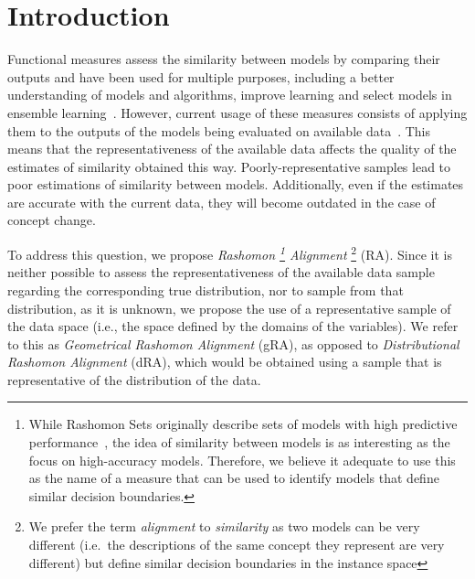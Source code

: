 \documentclass[runningheads]{llncs}
\begin{document}


\section{Introduction}

Functional measures assess the similarity between models by comparing their outputs and have been used for multiple purposes, including a better understanding of models and algorithms, improve learning and select models in ensemble learning~\cite{Klabunde2025}. However, current usage of these measures consists of applying them to the outputs of the models being evaluated on available data~\cite{Lee2011,Klabunde2025}. This means that the representativeness of the available data affects the quality of the estimates of similarity obtained this way. Poorly-representative samples lead to poor estimations of similarity between models. Additionally, even if the estimates are accurate with the current data, they will become outdated in the case of concept change.


To address this question, we propose \emph{Rashomon%
\footnote{While Rashomon Sets originally describe sets of models with high predictive performance~\cite{Breiman2001,Fisher2019}, the idea of similarity between models is as interesting as the focus on high-accuracy models. Therefore, we believe it adequate to use this as the name of a measure that can be used to identify models that define similar decision boundaries.} Alignment}%
\footnote{We prefer the term \emph{alignment} to \emph{similarity} as two models can be very different (i.e.\ the descriptions of the same concept they represent are very different) but define similar decision boundaries in the instance space}
(RA).
Since it is neither possible to assess the representativeness of the available data sample regarding the corresponding true distribution, nor to sample from that distribution, as it is unknown, we propose the use of a representative sample of the data space (i.e., the space defined by the domains of the variables). We refer to this as \emph{Geometrical Rashomon Alignment} (gRA), as opposed to \emph{Distributional Rashomon Alignment} (dRA), which would be obtained using a sample that is representative of the distribution of the data.
\end{document}
